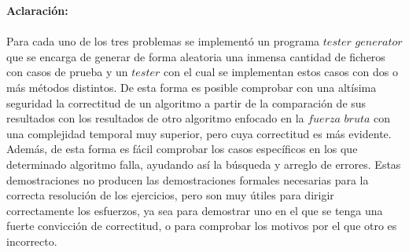 \documentclass[10pt,letterpaper]{article}
\begin{document}
{ 	\begin{abstract}
 		Primeramente lo atacamos con un algoritmo $fuerza$ $bruta$ exponencial que analiza todas las combinaciones posibles que resultan de distribuir los distintos expertos a tareas, y da la mejor soluci\'on posible. Este algoritmo es ineficiente, por lo cual lo intentamos por otras v\'ias. Una soluci\'on consiste en combinar una $mochila$ para obtener subconjuntos de elementos, con un algoritmo cuadr\'atico para determinar la mejor ganancia; este resulta $n^{3}*k$, tambi\'en de costo exponencial ya que depende del valor de $k$. Una cuarta idea ser\'ia  implementar un algoritmo para, dado un grupo de cient\'ificos fijo v\'alido y las tareas a completar por estos, encontrar la menor cantidad de d\'ias en que pueden lograrlo, de forma polinomial; esta es costosa, pues para determinar dicho grupo tengo que generar todas las combinaciones. Por \'ultimo vimos una idea $greedy$ que consist\'ia en hacer una b\'usqueda binaria sobre un predicado de la forma $no$,$no$...$si$,$si$... buscando el primer si que responda a la menor cantidad de d\'ias que se requieren para realizar las $n$ tareas, con un costo de $n^{2}\log{n}$. \\ \\ \\
 	\end{abstract}
 	
 	{\Large \bf Aclaraci\'on:} \\ \\
 	
 	Para cada uno de los tres problemas se implement\'o un programa $tester$ $generator$ que se encarga de generar de forma aleatoria una inmensa cantidad de ficheros con casos de prueba y un $tester$ con el cual se implementan estos casos con dos o m\'as m\'etodos distintos. De esta forma es posible comprobar con una alt\'isima seguridad la correctitud de un algoritmo a partir de la comparaci\'on de sus resultados con los resultados de otro algoritmo enfocado en la $fuerza$ $bruta$ con una complejidad temporal muy superior, pero cuya correctitud es m\'as evidente. Adem\'as, de esta forma es f\'acil comprobar los casos espec\'ificos en los que determinado algoritmo falla, ayudando as\'i la b\'usqueda y arreglo de errores. Estas demostraciones no producen las demostraciones formales necesarias para la correcta resoluci\'on de los ejercicios, pero son muy \'utiles para dirigir correctamente los esfuerzos, ya sea para demostrar uno en el que se tenga una fuerte convicci\'on de correctitud, o para comprobar los motivos por el que otro es incorrecto. \\ \\
 	
}
\end{document}
